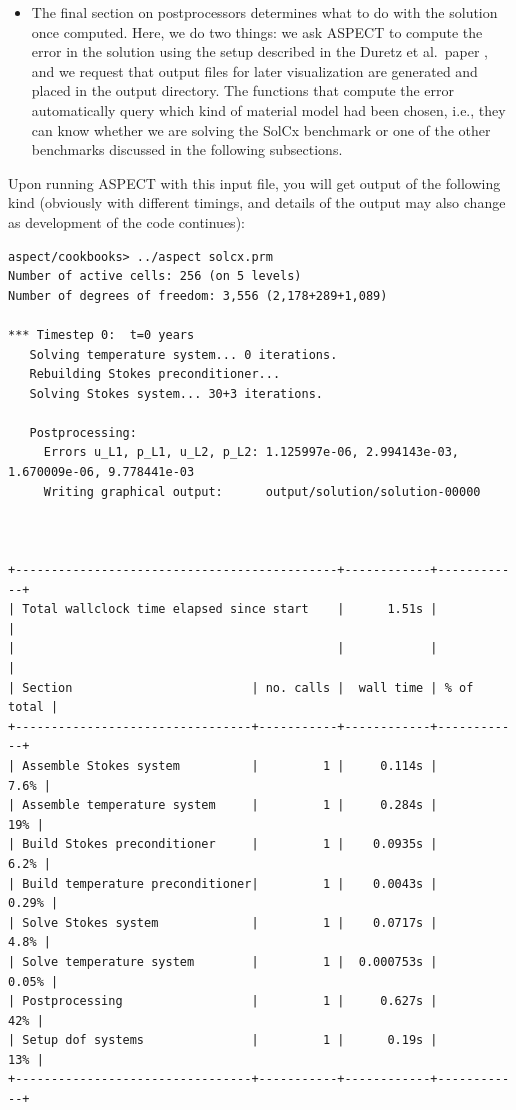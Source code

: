 \documentclass{article}
\newcommand{\aspect}{\textsc{ASPECT}}
\begin{document}
\begin{itemize}
\item The final section on postprocessors determines what to do with the
  solution once computed. Here, we do two things: we ask \aspect{} to compute
  the error in the solution using the setup described in the Duretz et
  al.~paper \cite{DMGT11}, and we request that output files for later
  visualization are generated and placed in the output directory. The
  functions that compute the error automatically query which kind of material
  model had been chosen, i.e., they can know whether we are solving the SolCx
  benchmark or one of the other benchmarks discussed in the following
  subsections.
\end{itemize}

Upon running \aspect{} with this input file, you will get output of the
following kind (obviously with different timings, and details of the output
may also change as development of the code continues):
\begin{lstlisting}[frame=single,language=ksh]
aspect/cookbooks> ../aspect solcx.prm
Number of active cells: 256 (on 5 levels)
Number of degrees of freedom: 3,556 (2,178+289+1,089)

*** Timestep 0:  t=0 years
   Solving temperature system... 0 iterations.
   Rebuilding Stokes preconditioner...
   Solving Stokes system... 30+3 iterations.

   Postprocessing:
     Errors u_L1, p_L1, u_L2, p_L2: 1.125997e-06, 2.994143e-03, 1.670009e-06, 9.778441e-03
     Writing graphical output:      output/solution/solution-00000



+---------------------------------------------+------------+------------+
| Total wallclock time elapsed since start    |      1.51s |            |
|                                             |            |            |
| Section                         | no. calls |  wall time | % of total |
+---------------------------------+-----------+------------+------------+
| Assemble Stokes system          |         1 |     0.114s |       7.6% |
| Assemble temperature system     |         1 |     0.284s |        19% |
| Build Stokes preconditioner     |         1 |    0.0935s |       6.2% |
| Build temperature preconditioner|         1 |    0.0043s |      0.29% |
| Solve Stokes system             |         1 |    0.0717s |       4.8% |
| Solve temperature system        |         1 |  0.000753s |      0.05% |
| Postprocessing                  |         1 |     0.627s |        42% |
| Setup dof systems               |         1 |      0.19s |        13% |
+---------------------------------+-----------+------------+------------+
\end{lstlisting}
\end{document}
